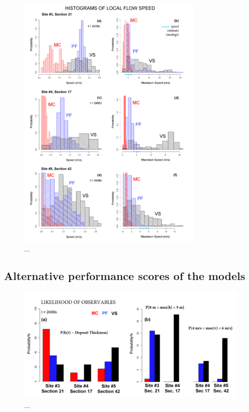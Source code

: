 \documentclass{article}
\begin{document}
\begin{figure}[H]
\centering
\includegraphics[width=0.8\textwidth]{Fig9.png}
\caption{...}
\label{Fig9}
\end{figure}

\subsection{Alternative performance scores of the models}

\begin{figure}[H]
\centering
\includegraphics[width=1\textwidth]{Fig10.png}
\caption{...}
\label{Fig10}
\end{figure}
\end{document}
